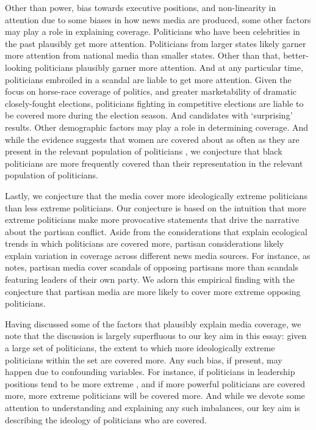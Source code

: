 \documentclass[12pt, letterpaper]{article}
\begin{document}
Other than power, bias towards executive positions, and non-linearity in attention due to some biases in how news media are produced, some other factors may play a role in explaining coverage. Politicians who have been celebrities in the past plausibly get more attention. Politicians from larger states likely garner more attention from national media than smaller states. Other than that, better-looking politicians plausibly garner more attention. And at any particular time, politicians embroiled in a scandal are liable to get more attention. Given the focus on horse-race coverage of politics, and greater marketability of dramatic closely-fought elections, politicians fighting in competitive elections are liable to be covered more during the election season. And candidates with `surprising' results. Other demographic factors may play a role in determining coverage. And while the evidence suggests that women are covered about as often as they are present in the relevant population of politicians \citep{shor2015}, we conjecture that black politicians are more frequently covered than their representation in the relevant population of politicians.

Lastly, we conjecture that the media cover more ideologically extreme politicians than less extreme politicians. Our conjecture is based on the intuition that more extreme politicians make more provocative statements that drive the narrative about the partisan conflict. Aside from the considerations that explain ecological trends in which politicians are covered more, partisan considerations likely explain variation in coverage across different news media sources. For instance, as \citet{puglisi2011} notes, partisan media cover scandals of opposing partisans more than scandals featuring leaders of their own party. We adorn this empirical finding with the conjecture that partisan media are more likely to cover more extreme opposing politicians.

Having discussed some of the factors that plausibly explain media coverage, we note that the discussion is largely superfluous to our key aim in this essay: given a large set of politicians, the extent to which more ideologically extreme politicians within the set are covered more. Any such bias, if present, may happen due to confounding variables. For instance, if politicians in leadership positions tend to be more extreme \citep{jessee2010}, and if more powerful politicians are covered more, more extreme politicians will be covered more. And while we devote some attention to understanding and explaining any such imbalances, our key aim is describing the ideology of politicians who are covered.
\end{document}
